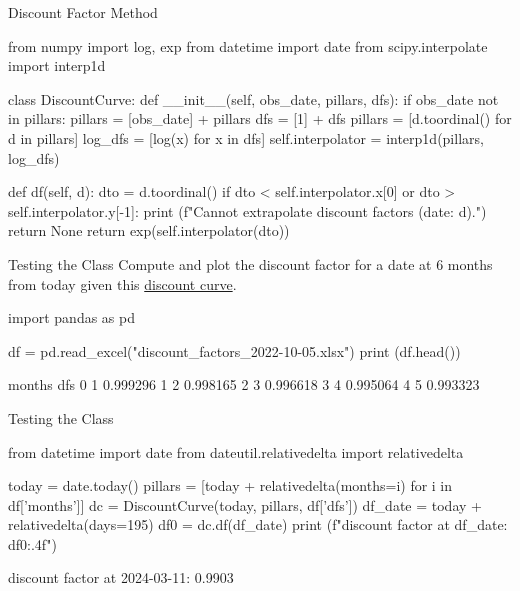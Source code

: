 \documentclass{beamer}
\begin{document}
\begin{frame}[fragile]{Discount Factor Method}
\begin{ipython}
from numpy import log, exp
from datetime import date
from scipy.interpolate import interp1d  
	
class DiscountCurve:
    def __init__(self, obs_date, pillars, dfs):
        if obs_date not in pillars:
            pillars = [obs_date] + pillars
            dfs = [1] + dfs
        pillars = [d.toordinal() for d in pillars]
        log_dfs = [log(x) for x in dfs]
        self.interpolator = interp1d(pillars, log_dfs)
        
  def df(self, d):
    dto = d.toordinal()   
    if dto < self.interpolator.x[0] or dto > self.interpolator.y[-1]:
      print (f"Cannot extrapolate discount factors (date: {d}).")
      return None
    return exp(self.interpolator(dto))
\end{ipython}
\end{frame}

\begin{frame}[fragile]{Testing the Class}
Compute and plot the discount factor for a date at 6 months from today given this \href{https://github.com/matteosan1/finance_course/raw/develop/input_files/discount_factors_2022-10-05.xlsx}{discount curve}.
\begin{ipython}
import pandas as pd

df = pd.read_excel("discount_factors_2022-10-05.xlsx")
print (df.head())
\end{ipython}
\begin{ioutput}
   months       dfs
0       1  0.999296
1       2  0.998165
2       3  0.996618
3       4  0.995064
4       5  0.993323
\end{ioutput}
\end{frame}

\begin{frame}[fragile]{Testing the Class}
\begin{ipython}
from datetime import date
from dateutil.relativedelta import relativedelta

today = date.today()
pillars = [today + relativedelta(months=i) for i in df['months']]
dc = DiscountCurve(today, pillars, df['dfs'])
df_date = today + relativedelta(days=195)
df0 = dc.df(df_date)
print (f"discount factor at {df_date}: {df0:.4f}")
\end{ipython}
\begin{ioutput}
discount factor at 2024-03-11: 0.9903
\end{ioutput}
\end{frame}
\end{document}
